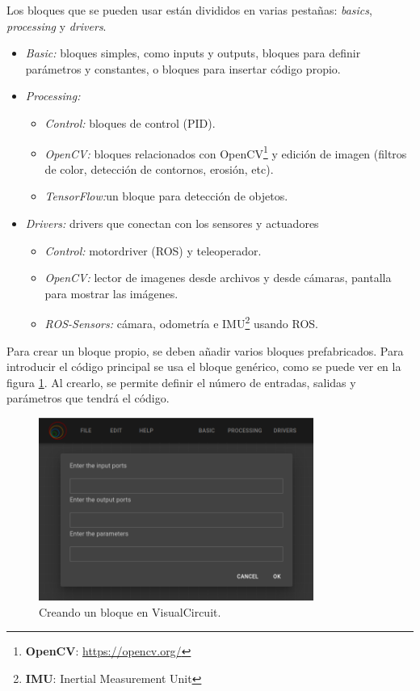 \newpage

Los bloques que se pueden usar están divididos en varias pestañas: \textit{basics}, \textit{processing} y \textit{drivers}.
\begin{itemize}
    \item \textit{Basic:} bloques simples, como inputs y outputs, bloques para definir parámetros y constantes, o bloques para insertar código propio.
    \item \textit{Processing:}
    \begin{itemize}
        \item \textit{Control:} bloques de control (PID).
        \item \textit{OpenCV:} bloques relacionados con OpenCV\footnote{\textbf{OpenCV}: \url{https://opencv.org/}} y edición de imagen (filtros de color, detección de contornos, erosión, etc).
        \item \textit{TensorFlow:}un bloque para detección de objetos.
    \end{itemize}
    \item \textit{Drivers:} drivers que conectan con los sensores y actuadores
    \begin{itemize}
        \item \textit{Control:} motordriver (ROS) y teleoperador.
        \item \textit{OpenCV:} lector de imagenes desde archivos y desde cámaras, pantalla para mostrar las imágenes.
        \item \textit{ROS-Sensors:}  cámara, odometría e IMU\footnote{\textbf{IMU}: Inertial Measurement Unit} usando ROS.
    \end{itemize}
\end{itemize}

Para crear un bloque propio, se deben añadir varios bloques prefabricados. Para introducir el código principal se usa el bloque genérico,
como se puede ver en la figura \ref{fig:VC_creando_bloque}. Al crearlo, se permite definir el número de entradas, salidas y parámetros que tendrá el código.

\begin{figure} [H]
    \begin{center}
        \includegraphics[width=9cm]{figs/c4/VC_pre_codeblock.png}
    \end{center}
    \caption[Creando un bloque en VisualCircuit]{Creando un bloque en VisualCircuit.}
    \label{fig:VC_creando_bloque}
\end{figure}

